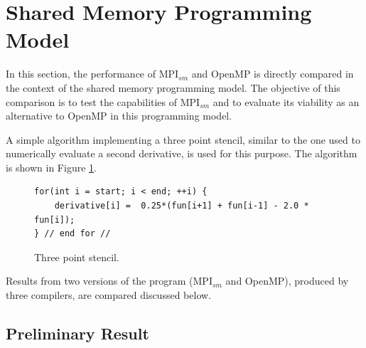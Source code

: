 \section{Shared Memory Programming Model}

In this section, the performance of MPI$_{sm}$ and OpenMP is directly compared in the context of the shared memory programming model. The objective of this comparison is to test the capabilities of MPI$_{sm}$ and to evaluate its viability as an alternative to OpenMP in this programming model.

\medskip

A simple algorithm implementing a three point stencil, similar to the one used to numerically evaluate a second derivative, is used for this purpose. The algorithm is shown in Figure \ref{fig:ThreePointStencil}.

\medskip
  
\begin{figure} [h!]
\centering
\captionsetup{justification=centering, singlelinecheck=false}
\begin{lstlisting}[style=CStyle]
for(int i = start; i < end; ++i) {
    derivative[i] =  0.25*(fun[i+1] + fun[i-1] - 2.0 * fun[i]);
} // end for //
\end{lstlisting}    
\caption{Three point stencil.}
\label{fig:ThreePointStencil}
\end{figure}

\medskip

Results from two versions of the program (MPI$_{sm}$ and OpenMP), produced by three compilers, are compared discussed below.

\subsection*{Preliminary Result}

